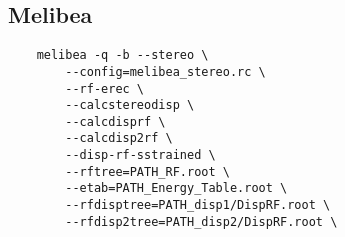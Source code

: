 \subsection{Melibea}%
\label{sub:melibea}

\begin{lstlisting}
	melibea -q -b --stereo \
		--config=melibea_stereo.rc \
		--rf-erec \
		--calcstereodisp \
		--calcdisprf \
		--calcdisp2rf \
		--disp-rf-sstrained \
		--rftree=PATH_RF.root \
		--etab=PATH_Energy_Table.root \
		--rfdisptree=PATH_disp1/DispRF.root \
		--rfdisp2tree=PATH_disp2/DispRF.root \
\end{lstlisting}
